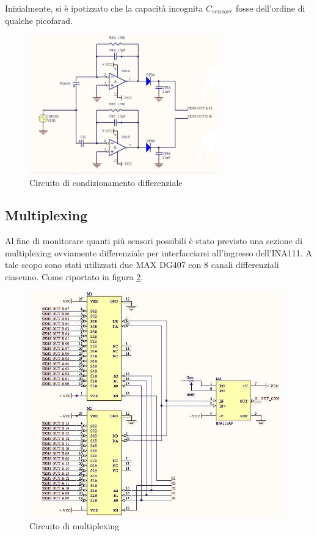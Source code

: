 \documentclass[12pt,a4paper,oneside,openright,italian]{article}
\begin{document}
Inizialmente, si \`e ipotizzato che la capacit\`a incognita $C_{sensore}$ fosse dell'ordine di qualche picofarad.



\begin{figure}[!hbp]
  \centering
  \includegraphics[width=230pt]{immagini/condizionamento.jpg}
  \caption{Circuito di condizionamento differenziale}
  \label{condizionamento}
\end{figure}


\subsection{Multiplexing}
Al fine di monitorare quanti pi\`u sensori possibili \`e stato previsto una sezione di multiplexing ovviamente differenziale per interfacciarsi all'ingresso dell'INA111. A tale scopo sono stati utilizzati due MAX DG407 con 8 canali differenziali ciascuno. Come riportato in figura \ref{multiplexing}.

\begin{figure}[!hbp]
  \centering
  \includegraphics[width=310pt]{immagini/multiplexing.jpg}
  \caption{Circuito di multiplexing}
  \label{multiplexing}
\end{figure}
\end{document}
